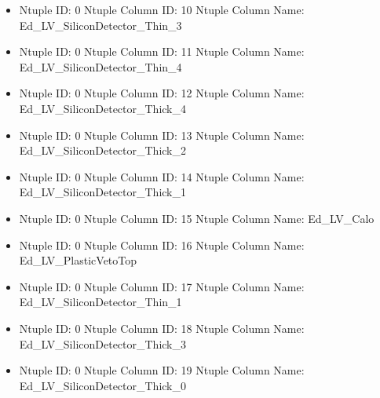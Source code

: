 \documentclass[8pt]{beamer}
\begin{document}
\begin{frame}
\begin{itemize}
        \item Ntuple ID: 0 Ntuple Column ID: 10 Ntuple Column Name: Ed\_LV\_SiliconDetector\_Thin\_3
        
        \item Ntuple ID: 0 Ntuple Column ID: 11 Ntuple Column Name: Ed\_LV\_SiliconDetector\_Thin\_4
        
        \item Ntuple ID: 0 Ntuple Column ID: 12 Ntuple Column Name: Ed\_LV\_SiliconDetector\_Thick\_4
        
        \item Ntuple ID: 0 Ntuple Column ID: 13 Ntuple Column Name: Ed\_LV\_SiliconDetector\_Thick\_2
        
        \item Ntuple ID: 0 Ntuple Column ID: 14 Ntuple Column Name: Ed\_LV\_SiliconDetector\_Thick\_1
        
        \item Ntuple ID: 0 Ntuple Column ID: 15 Ntuple Column Name: Ed\_LV\_Calo
        
        \item Ntuple ID: 0 Ntuple Column ID: 16 Ntuple Column Name: Ed\_LV\_PlasticVetoTop
        
        \item Ntuple ID: 0 Ntuple Column ID: 17 Ntuple Column Name: Ed\_LV\_SiliconDetector\_Thin\_1
        
        \item Ntuple ID: 0 Ntuple Column ID: 18 Ntuple Column Name: Ed\_LV\_SiliconDetector\_Thick\_3
        
        \item Ntuple ID: 0 Ntuple Column ID: 19 Ntuple Column Name: Ed\_LV\_SiliconDetector\_Thick\_0
        
        \end{itemize}
        
            \end{frame}
            
\end{document}
